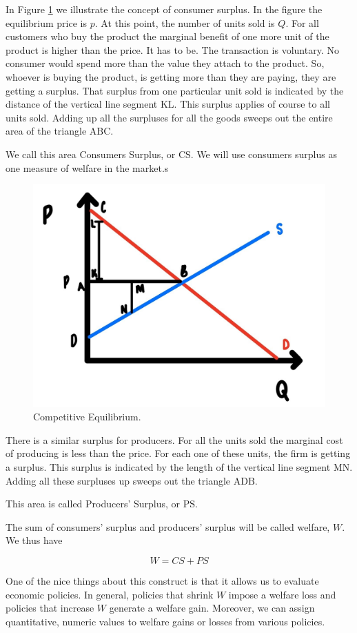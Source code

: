 \documentclass[
]{book}
\begin{document}
In Figure \ref{fig:compmarkets02} we illustrate the concept of consumer surplus. In the figure the equilibrium price is \(p\). At this point, the number of units sold is \(Q\). For all customers who buy the product the marginal benefit of one more unit of the product is higher than the price. It has to be. The transaction is voluntary. No consumer would spend more than the value they attach to the product. So, whoever is buying the product, is getting more than they are paying, they are getting a surplus. That surplus from one particular unit sold is indicated by the distance of the vertical line segment \(\text{KL}\). This surplus applies of course to all units sold. Adding up all the surpluses for all the goods sweeps out the entire area of the triangle \(\text{ABC}\).

We call this area Consumers Surplus, or \(\text{CS}\). We will use consumers surplus as one measure of welfare in the market.s

\begin{figure}

{\centering \includegraphics[width=0.5\linewidth]{img/compmarkets/fig2} 

}

\caption{Competitive Equilibrium.}\label{fig:compmarkets02}
\end{figure}

There is a similar surplus for producers. For all the units sold the marginal cost of producing is less than the price. For each one of these units, the firm is getting a surplus. This surplus is indicated by the length of the vertical line segment \(\text{MN}\). Adding all these surpluses up sweeps out the triangle \(\text{ADB}\).

This area is called Producers' Surplus, or \(\text{PS}\).

The sum of consumers' surplus and producers' surplus will be called welfare, \(W\). We thus have

\[W = CS + PS\]

One of the nice things about this construct is that it allows us to evaluate economic policies. In general, policies that shrink \(W\) impose a welfare loss and policies that increase \(W\) generate a welfare gain. Moreover, we can assign quantitative, numeric values to welfare gains or losses from various policies.
\end{document}

